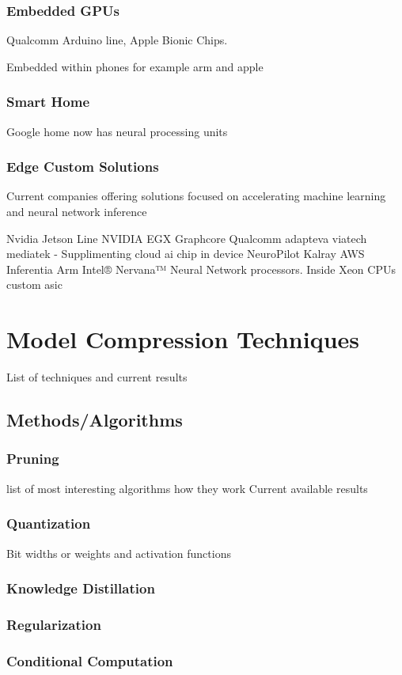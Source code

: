 \subsubsection{Embedded GPUs}
Qualcomm Arduino line, Apple Bionic Chips.

Embedded within phones for example arm and apple
\subsubsection{Smart Home}
Google home now has neural processing units
\subsubsection{Edge Custom Solutions}
Current companies offering solutions focused on accelerating machine learning and neural network inference

Nvidia Jetson Line
NVIDIA EGX
Graphcore
Qualcomm
adapteva
viatech
mediatek - Supplimenting cloud ai chip in device NeuroPilot
Kalray
AWS Inferentia
Arm
Intel® Nervana™ Neural Network processors. Inside Xeon CPUs
custom asic

\section{Model Compression Techniques}
List of techniques and current results
\subsection{Methods/Algorithms}
\subsubsection{Pruning}
list of most interesting algorithms
how they work
Current available results
\subsubsection{Quantization}
Bit widths or weights and activation functions
\subsubsection{Knowledge Distillation}
\subsubsection{Regularization}
\subsubsection{Conditional Computation}

